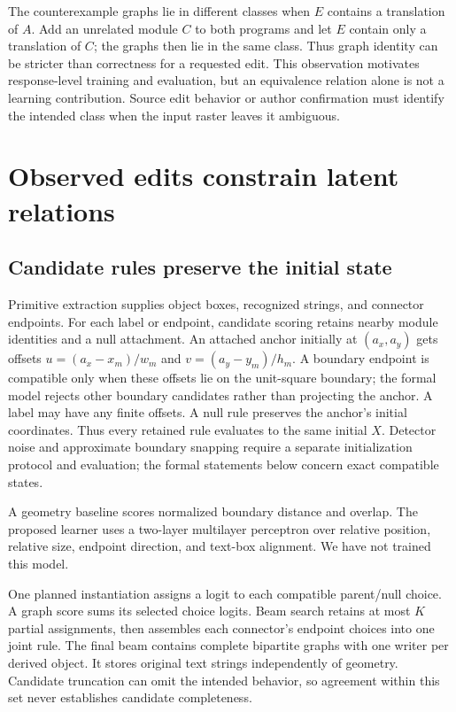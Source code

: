 \documentclass{article}
\begin{document}
The counterexample graphs lie in different classes when $E$ contains a translation of $A$. Add an unrelated module $C$ to both programs and let $E$ contain only a translation of $C$; the graphs then lie in the same class. Thus graph identity can be stricter than correctness for a requested edit. This observation motivates response-level training and evaluation, but an equivalence relation alone is not a learning contribution. Source edit behavior or author confirmation must identify the intended class when the input raster leaves it ambiguous.

\section{Observed edits constrain latent relations}
\subsection{Candidate rules preserve the initial state}
Primitive extraction supplies object boxes, recognized strings, and connector endpoints. For each label or endpoint, candidate scoring retains nearby module identities and a null attachment. An attached anchor initially at $(a_x,a_y)$ gets offsets $u=(a_x-x_m)/w_m$ and $v=(a_y-y_m)/h_m$. A boundary endpoint is compatible only when these offsets lie on the unit-square boundary; the formal model rejects other boundary candidates rather than projecting the anchor. A label may have any finite offsets. A null rule preserves the anchor's initial coordinates. Thus every retained rule evaluates to the same initial $X$. Detector noise and approximate boundary snapping require a separate initialization protocol and evaluation; the formal statements below concern exact compatible states.

A geometry baseline scores normalized boundary distance and overlap. The proposed learner uses a two-layer multilayer perceptron over relative position, relative size, endpoint direction, and text-box alignment. We have not trained this model.

One planned instantiation assigns a logit to each compatible parent/null choice. A graph score sums its selected choice logits. Beam search retains at most $K$ partial assignments, then assembles each connector's endpoint choices into one joint rule. The final beam contains complete bipartite graphs with one writer per derived object. It stores original text strings independently of geometry. Candidate truncation can omit the intended behavior, so agreement within this set never establishes candidate completeness.
\end{document}
